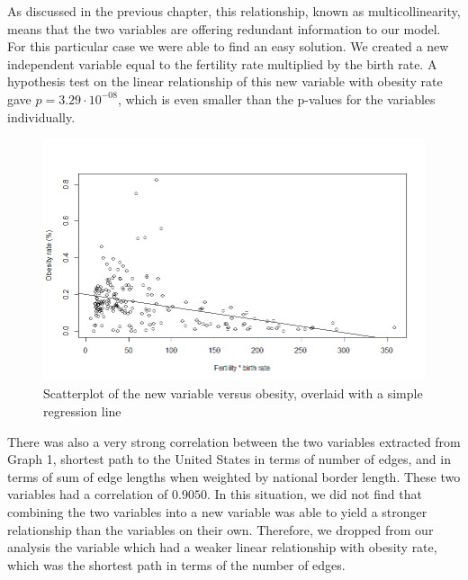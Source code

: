 \documentclass[oneside,12pt]{report}
\begin{document}
As discussed in the previous chapter, this relationship, known as multicollinearity, means that the two variables are offering redundant information to our model. For this particular case we were able to find an easy solution. We created a new independent variable equal to the fertility rate multiplied by the birth rate. A hypothesis test on the linear relationship of this new variable with obesity rate gave \begin{math}p=3.29\cdot10^{-08}\end{math}, which is even smaller than the p-values for the variables individually.

\begin{figure}
\centering
\label{fig:fertility.birth_rate}
\includegraphics[width=\textwidth]{fertility-birth_rate-obesity-scatter.png}
\caption[Scatterplot of a new variable created from combining two variables]{Scatterplot of the new variable versus obesity, overlaid with a simple regression line}
\end{figure}

There was also a very strong correlation between the two variables extracted from Graph 1, shortest path to the United States in terms of number of edges, and in terms of sum of edge lengths when weighted by national border length. These two variables had a correlation of \begin{math}0.9050\end{math}. In this situation, we did not find that combining the two variables into a new variable was able to yield a stronger relationship than the variables on their own. Therefore, we dropped from our analysis the variable which had a weaker linear relationship with obesity rate, which was the shortest path in terms of the number of edges.
\end{document}
